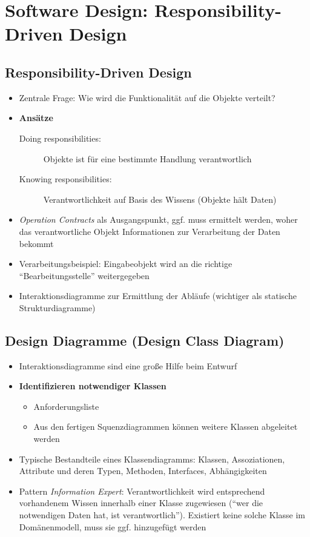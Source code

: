 \section{Software Design: Responsibility-Driven Design}

\subsection{Responsibility-Driven Design}
\begin{itemize}
	\item Zentrale Frage: Wie wird die Funktionalität auf die Objekte verteilt?
	\item \textbf{Ansätze}
	\begin{description}
		\item [Doing responsibilities:] Objekte ist für eine bestimmte Handlung verantwortlich
		\item [Knowing responsibilities:] Verantwortlichkeit auf Basis des Wissens (Objekte hält Daten)
	\end{description}
	\item \textit{Operation Contracts} als Ausgangspunkt, ggf. muss ermittelt werden, woher das verantwortliche Objekt Informationen zur Verarbeitung der Daten bekommt
	\item Verarbeitungsbeispiel: Eingabeobjekt wird an die richtige "`Bearbeitungsstelle"' weitergegeben
	\item Interaktionsdiagramme zur Ermittlung der Abläufe (wichtiger als statische Strukturdiagramme)
\end{itemize}


\subsection{Design Diagramme (Design Class Diagram)}
\begin{itemize}
	\item Interaktionsdiagramme sind eine große Hilfe beim Entwurf
	\item \textbf{Identifizieren notwendiger Klassen}
	\begin{itemize}
		\item Anforderungsliste
		\item Aus den fertigen Squenzdiagrammen können weitere Klassen abgeleitet werden
	\end{itemize}
	\item Typische Bestandteile eines Klassendiagramms: Klassen, Assoziationen, Attribute und deren Typen, Methoden, Interfaces, Abhängigkeiten
	\item Pattern \textit{Information Expert}: Verantwortlichkeit wird entsprechend vorhandenem Wissen innerhalb einer Klasse zugewiesen ("`wer die notwendigen Daten hat, ist verantwortlich"'). Existiert keine solche Klasse im Domänenmodell, muss sie ggf. hinzugefügt werden
\end{itemize}


